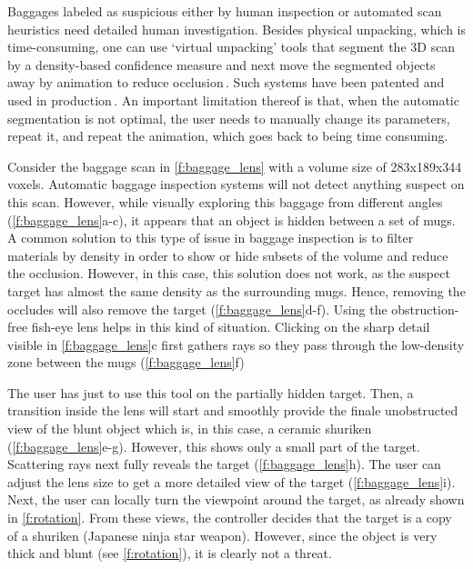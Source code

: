 Baggages labeled as suspicious either by human inspection or automated scan heuristics need detailed human investigation. Besides physical unpacking, which is time-consuming, one can use `virtual unpacking' tools that segment the 3D scan by a density-based confidence measure and next move the segmented objects away by animation to reduce occlusion\,\cite{Li:2012:LVV:2425296.2425325}. Such systems have been patented and used in production\,\cite{patent}. An important limitation thereof is that, when the automatic segmentation is not optimal, the user needs to manually change its parameters, repeat it, and repeat the animation, which goes back to being time consuming.

Consider the baggage scan in \autoref{f:baggage_lens} with a volume size of 283x189x344 voxels. Automatic baggage inspection systems will not detect anything suspect on this scan. However, while visually exploring this baggage from different angles (\autoref{f:baggage_lens}a-c), it appears that an object is hidden between a set of mugs. A common solution to this type of issue in baggage inspection is to filter materials by density in order to show or hide subsets of the volume and reduce the occlusion. However, in this case, this solution does not work, as the suspect target has almost the same density as the surrounding mugs. Hence, removing the occludes will also remove the target (\autoref{f:baggage_lens}d-f). Using the obstruction-free fish-eye lens helps in this kind of situation. Clicking on the sharp detail visible in \autoref{f:baggage_lens}c first gathers rays so they pass through the low-density zone between the mugs (\autoref{f:baggage_lens}f)

The user has just to use this tool on the partially hidden target. Then, a transition inside the lens will start and smoothly provide the finale unobstructed view of the blunt object which is, in this case, a ceramic shuriken (\autoref{f:baggage_lens}e-g). However, this shows only a small part of the target. Scattering rays next fully reveals the target (\autoref{f:baggage_lens}h). The user can adjust the lens size to get a more detailed view of the target (\autoref{f:baggage_lens}i). Next, the user can locally turn the viewpoint around the target, as already shown in \autoref{f:rotation}. From these views, the controller decides that the target is a copy of a shuriken (Japanese ninja star weapon). However, since the object is very thick and blunt (see \autoref{f:rotation}), it is clearly not a threat.

